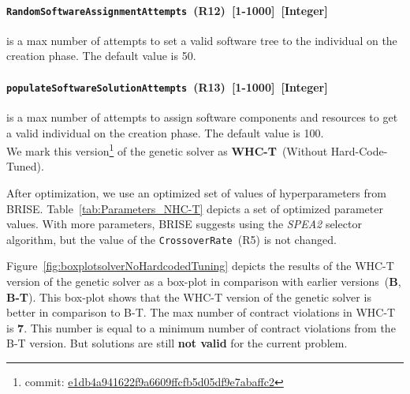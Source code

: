 \paragraph{\texttt{RandomSoftwareAssignmentAttempts}~(R12)~[1-1000]~[Integer]} is a max number of attempts to set a valid software tree to the individual on the creation phase. The default value is 50.
\paragraph{\texttt{populateSoftwareSolutionAttempts}~(R13)~[1-1000]~[Integer]} is a max number of attempts to assign software components and resources to get a valid individual on the creation phase. The default value is 100.\\

We mark this version\footnote{commit: \href{https://git-st.inf.tu-dresden.de/mquat/mquat2/commit/e1db4a941622f9a6609ffcfb5d05df9e7abaffc2}{e1db4a941622f9a6609ffcfb5d05df9e7abaffc2}} of the genetic solver as \textbf{WHC-T}~(Without Hard-Code-Tuned).

After optimization, we use an optimized set of values of hyperparameters from BRISE. Table~\ref{tab:Parameters_NHC-T} depicts a set of optimized parameter values. With more parameters, BRISE suggests using the \textit{SPEA2} selector algorithm, but the value of the \texttt{CrossoverRate}~(R5) is not changed.

\begin{table}
	\centering
	\caption{Optimized parameters of WHC-T version of the genetic solver}\label{tab:Parameters_NHC-T}
\end{table}

Figure~\ref{fig:boxplotsolverNoHardcodedTuning} depicts the results of the WHC-T version of the genetic solver as a box-plot in comparison with earlier versions~(\textbf{B}, \textbf{B-T}). This box-plot shows that the WHC-T version of the genetic solver is better in comparison to B-T. The max number of contract violations in WHC-T is \textbf{7}. This number is equal to a minimum number of contract violations from the B-T version. But solutions are still \textbf{not valid} for the current problem. 

